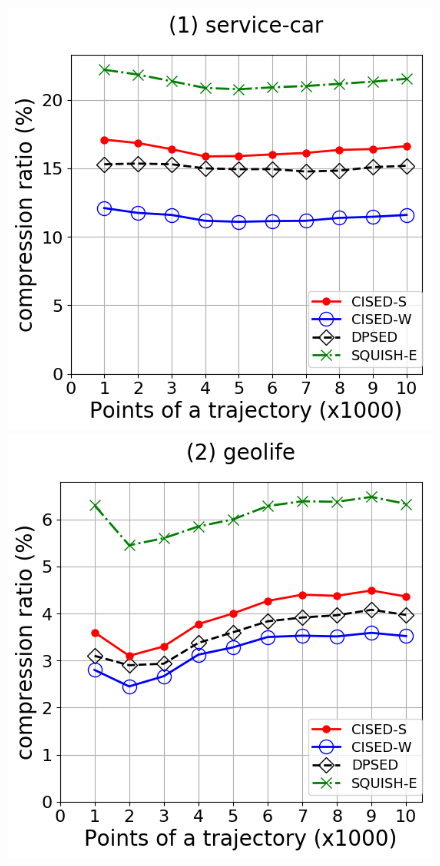 \begin{figure}[tb!]
\centering
\includegraphics[scale = 0.2750]{Figures/Exp-CR-size-service.png}\hspace{3ex}
\includegraphics[scale = 0.2750]{Figures/Exp-CR-size-geolife.png}\hspace{3ex}

\end{figure}
